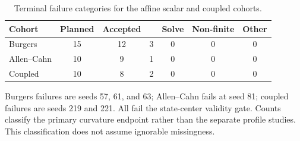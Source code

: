 \begin{table}[!htbp]
\centering
\caption{Terminal failure categories for the affine scalar and coupled cohorts.}
\label{tab:failure_counts}
\small
\setlength{\tabcolsep}{4pt}
\begin{tabular}{l *{6}{S[table-format=2.0]}}
\toprule
{Cohort} & {Planned} & {Accepted} & {} & {Solve} & {Non-finite} & {Other} \\
\midrule
Burgers & 15 & 12 & 3 & 0 & 0 & 0 \\
Allen--Cahn & 10 & 9 & 1 & 0 & 0 & 0 \\
Coupled & 10 & 8 & 2 & 0 & 0 & 0 \\
\bottomrule
\end{tabular}
\par\vspace{3pt}\begin{minipage}{.98\linewidth}\footnotesize Burgers failures are seeds 57, 61, and 63; Allen--Cahn fails at seed 81; coupled failures are seeds 219 and 221. All fail the state-center validity gate. Counts classify the primary curvature endpoint rather than the separate profile studies. This classification does not assume ignorable missingness.\end{minipage}
\end{table}
